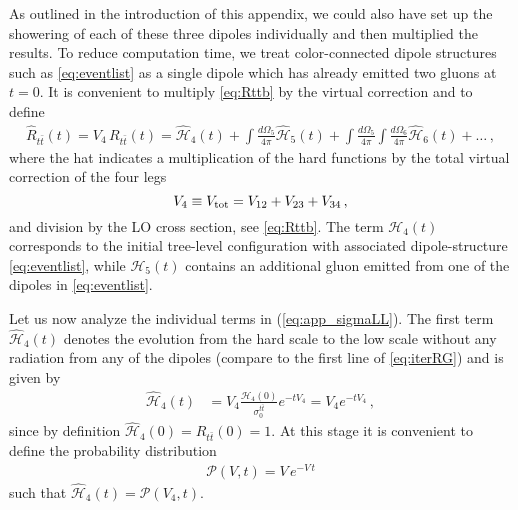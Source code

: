 \documentclass[11pt,a4paper]{article}
\begin{document}
As outlined in the introduction of this appendix, we could also have set up the showering of each of these three dipoles individually and then multiplied the results. To reduce computation time, we treat color-connected dipole structures such as \eqref{eq:eventlist} as a single dipole which has already emitted two gluons at $t=0$. It is convenient to multiply \eqref{eq:Rttb} by the virtual correction and to define
\begin{align}
\hat{R}_{t\bar{t}}(t)= V_{4}\, R_{t\bar{t}}(t)=\mathcal{\hat{H}}_4(t) + \int \frac{d\Omega_5}{4\pi} \mathcal{\hat{H}}_{5}(t) +\int \frac{d\Omega_5}{4\pi}\int \frac{d\Omega_6}{4\pi}  \mathcal{\hat{H}}_{6}(t) + \dots\,,\label{eq:app_sigmaLL}
\end{align}
where the hat indicates a multiplication of the hard functions by the total virtual correction of the four legs
\begin{equation} \label{eq:app_Vtot}
V_{4} \equiv V_{\rm tot} = V_{12} + V_{23} + V_{34} \, , 
\end{equation}
and division by the LO cross section, see \eqref{eq:Rttb}. The term $\mathcal{H}_4(t)$ corresponds to the initial tree-level configuration with associated dipole-structure \eqref{eq:eventlist}, while $\mathcal{H}_5(t)$ contains an additional gluon emitted from one of the dipoles in \eqref{eq:eventlist}.

Let us now analyze the individual terms in (\ref{eq:app_sigmaLL}). The first term $\mathcal{\hat{H}}_4(t)$ denotes the evolution from the hard scale to the low scale without any radiation from any of the dipoles (compare to the first line of \eqref{eq:iterRG}) and is given by
\begin{align}
\mathcal{\hat{H}}_4(t)&= V_{4} \frac{\mathcal{H}_4(0)}{\sigma_0^{t \bar{t}}} e^{-t V_{4} } = V_{4} e^{-t  V_{4}}\, ,
\end{align} 
since by definition $\mathcal{\hat{H}}_4(0)=R_{t\bar{t}}(0)=1$. At this stage it is convenient to define the probability distribution
\begin{align}
\mathcal{P}(V,t)=V\,e^{-V\,t}
\end{align} 
such that $\mathcal{\hat{H}}_4(t)=\mathcal{P}(V_{4},t)$.
\end{document}

